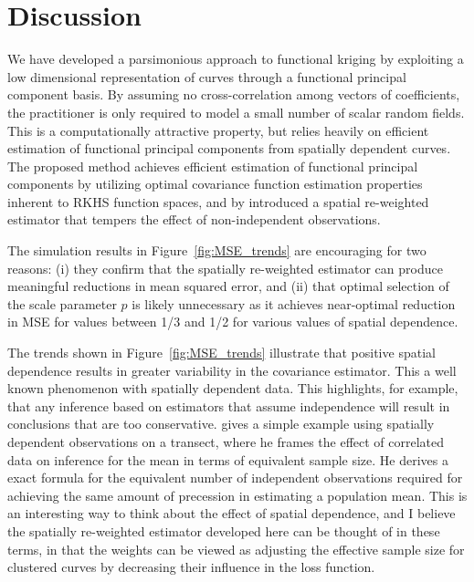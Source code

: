 
\section{Discussion} %
\label{sec:discussion}
 We have developed a parsimonious approach to functional kriging by exploiting a low dimensional representation of curves through a functional principal component basis. By assuming no cross-correlation among vectors of coefficients, the practitioner is only required to model a small number of scalar random fields. This is a computationally attractive property, but relies heavily on efficient estimation of functional principal components from spatially dependent curves.  The proposed method achieves efficient estimation of functional principal components by utilizing optimal covariance function estimation properties inherent to RKHS function spaces, and by introduced a spatial re-weighted estimator that tempers the effect of non-independent observations. 
 
 The simulation results in Figure~\ref{fig:MSE_trends} are encouraging for two reasons: (i) they confirm that the spatially re-weighted estimator can produce meaningful reductions in mean squared error, and (ii) that optimal selection of the scale parameter $p$ is likely unnecessary as it achieves near-optimal reduction in MSE for values between 1/3 and 1/2 for various values of spatial dependence.

The trends shown in Figure~\ref{fig:MSE_trends} illustrate that positive spatial dependence results in greater variability in the covariance estimator. This a well known phenomenon with spatially dependent data. This highlights, for example, that any inference based on estimators that assume independence will result in conclusions that are too conservative. \cite{cressie1993statistics} gives a simple example using spatially dependent observations on a transect, where he frames the effect of correlated data on inference for the mean in terms of equivalent sample size. He derives a exact formula for the equivalent number of independent observations required for achieving the same amount of precession in estimating a population mean. This is an interesting way to think about the effect of spatial dependence, and I believe the spatially re-weighted estimator developed here can be thought of in these terms, in that the weights can be viewed as adjusting the effective sample size for clustered curves by decreasing their influence in the loss function. 

